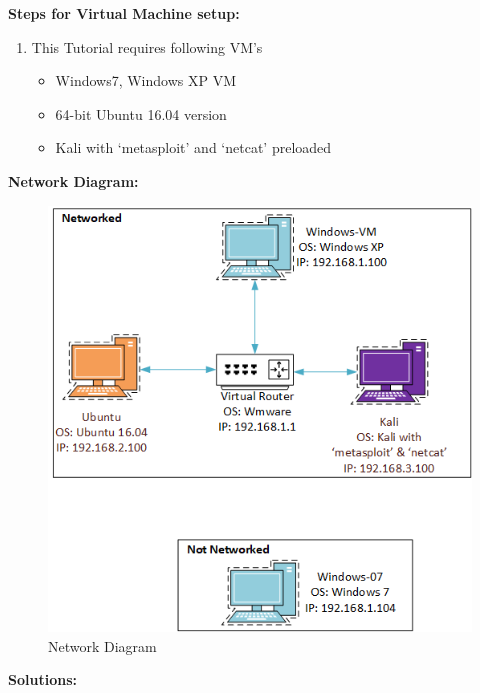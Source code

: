 \documentclass[12pt]{article}
\newcommand{\ben}{\begin{enumerate}}
\newcommand{\een}{\end{enumerate}}
\begin{document}
\textbf{Steps for Virtual Machine setup:}

\ben
\item This Tutorial requires following VM's
\begin{itemize}
	\item Windows7, Windows XP VM
	\item 64-bit Ubuntu 16.04 version
	\item Kali with `metasploit' and `netcat' preloaded
	
\end{itemize}
\een

\pagebreak
\textbf{Network Diagram:}
\begin{figure}[ht]
	\centering
	\includegraphics{NetworkDiagram.png}
	\caption{Network Diagram}
	\label{Network Diagram}
\end{figure}
\pagebreak



\textbf{Solutions:}
\end{document}
